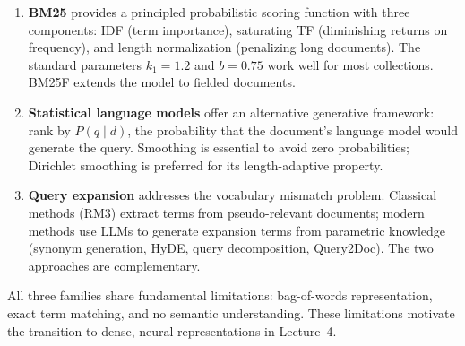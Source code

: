 \documentclass[11pt,a4paper]{article}
\theoremstyle{definition}
\theoremstyle{plain}
\begin{document}
\begin{enumerate}
    \item \textbf{BM25} provides a principled probabilistic scoring function with three components: IDF (term importance), saturating TF (diminishing returns on frequency), and length normalization (penalizing long documents). The standard parameters $k_1 = 1.2$ and $b = 0.75$ work well for most collections. BM25F extends the model to fielded documents.
    
    \item \textbf{Statistical language models} offer an alternative generative framework: rank by $P(q \mid d)$, the probability that the document's language model would generate the query. Smoothing is essential to avoid zero probabilities; Dirichlet smoothing is preferred for its length-adaptive property.
    
    \item \textbf{Query expansion} addresses the vocabulary mismatch problem. Classical methods (RM3) extract terms from pseudo-relevant documents; modern methods use LLMs to generate expansion terms from parametric knowledge (synonym generation, HyDE, query decomposition, Query2Doc). The two approaches are complementary.
\end{enumerate}

All three families share fundamental limitations: bag-of-words representation, exact term matching, and no semantic understanding. These limitations motivate the transition to dense, neural representations in Lecture~4.




\end{document}
